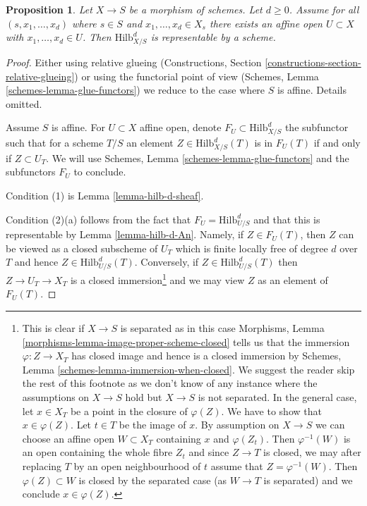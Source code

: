 \documentclass{stacks-project}
\theoremstyle{plain}
\newtheorem{proposition}[subsection]{Proposition}
\theoremstyle{definition}
\theoremstyle{remark}
\numberwithin{equation}{subsection}
\def\Hilbfunctor{\mathrm{Hilb}}
\begin{document}
\begin{proposition}
\label{proposition-hilb-d-representable}
Let $X \to S$ be a morphism of schemes. Let $d \geq 0$. Assume
for all $(s, x_1, \ldots, x_d)$ where $s \in S$ and
$x_1, \ldots, x_d \in X_s$ there exists an affine open $U \subset X$
with $x_1, \ldots, x_d \in U$. Then $\Hilbfunctor^d_{X/S}$ is
representable by a scheme.
\end{proposition}

\begin{proof}
Either using relative glueing (Constructions, Section
\ref{constructions-section-relative-glueing}) or using
the functorial point of view
(Schemes, Lemma \ref{schemes-lemma-glue-functors})
we reduce to the case where $S$ is affine. Details omitted.

\medskip\noindent
Assume $S$ is affine. For $U \subset X$ affine open, denote
$F_U \subset \Hilbfunctor^d_{X/S}$ the subfunctor such that
for a scheme $T/S$ an element $Z \in \Hilbfunctor^d_{X/S}(T)$
is in $F_U(T)$ if and only if $Z \subset U_T$. We will use
Schemes, Lemma \ref{schemes-lemma-glue-functors}
and the subfunctors $F_U$ to conclude.

\medskip\noindent
Condition (1) is Lemma \ref{lemma-hilb-d-sheaf}.

\medskip\noindent
Condition (2)(a) follows from the fact that $F_U = \Hilbfunctor^d_{U/S}$
and that this is representable by Lemma \ref{lemma-hilb-d-An}.
Namely, if $Z \in F_U(T)$, then $Z$ can be viewed as a closed subscheme
of $U_T$ which is finite locally free of degree $d$ over $T$ and hence
$Z \in \Hilbfunctor^d_{U/S}(T)$. Conversely, if $Z \in \Hilbfunctor^d_{U/S}(T)$
then $Z \to U_T \to X_T$ is a closed immersion\footnote{This is clear
if $X \to S$ is separated as in this case Morphisms, Lemma
\ref{morphisms-lemma-image-proper-scheme-closed}
tells us that the immersion $\varphi : Z \to X_T$ has closed image
and hence is a closed immersion by
Schemes, Lemma \ref{schemes-lemma-immersion-when-closed}. We suggest the
reader skip the rest of this footnote as we don't know of any instance
where the assumptions on $X \to S$ hold but $X \to S$ is not separated.
In the general case, let $x \in X_T$ be a point in the closure of
$\varphi(Z)$. We have to show that $x \in \varphi(Z)$. Let $t \in T$ be the
image of $x$. By assumption on $X \to S$ we can choose an affine open
$W \subset X_T$ containing $x$ and $\varphi(Z_t)$. Then $\varphi^{-1}(W)$
is an open containing the whole fibre $Z_t$ and since $Z \to T$ is closed,
we may after replacing $T$ by an open neighbourhood of $t$ assume that
$Z = \varphi^{-1}(W)$. Then $\varphi(Z) \subset W$ is closed by the
separated case (as $W \to T$ is separated) and we conclude $x \in \varphi(Z)$.}
and we may view $Z$ as an element of $F_U(T)$.


\end{proof}
\end{document}
